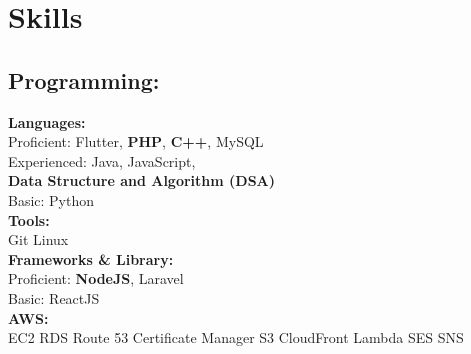 \documentclass[]{deedy-resume-openfont}
\begin{document}
%
%

%
%

%
%

\begin{minipage}[t]{0.4\textwidth} 


\section{Skills}
\subsection{Programming:}
\sectionsep
\textbf{Languages:}\\
\textbullet{} Proficient: Flutter, \textbf{PHP}, \textbf{C++}, MySQL\\
\textbullet{} Experienced: Java, JavaScript,\\ \hspace{\topsep}\textbf{Data Structure and Algorithm (DSA)}\\
\textbullet{} Basic: Python\\

\textbf{Tools:}\\
\textbullet{} Git \textbullet{} Linux\\

\textbf{Frameworks \& Library:} \\
\textbullet{} Proficient: \textbf{NodeJS}, Laravel \\
\textbullet{} Basic: ReactJS \\

\textbf{AWS:}\\
EC2 
\textbullet{} RDS 
\textbullet{} Route 53 
\textbullet{} Certificate Manager 
\textbullet{} S3 
\textbullet{} CloudFront 
\textbullet{} Lambda 
\textbullet{} SES 
\textbullet{} SNS \\



\end{minipage}
\end{document}
